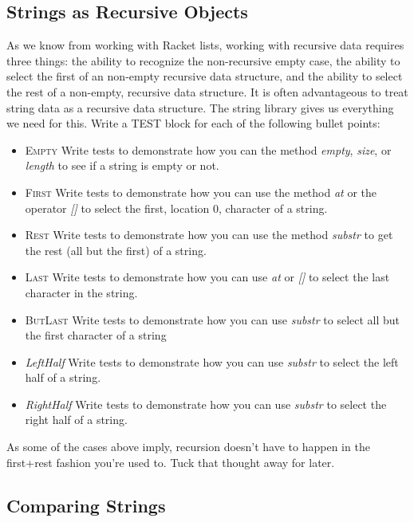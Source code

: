\documentclass[]{tufte-handout}
\begin{document}
\subsection{Strings as Recursive Objects}

As we know from working with Racket lists, working with recursive data requires three things: the ability to recognize the non-recursive empty case, the ability to select the first of an non-empty recursive data structure, and the ability to select the rest of a non-empty, recursive data structure. It is often advantageous to treat string data as a recursive data structure.  The string library gives us everything we need for this.  Write a TEST block for each of the following bullet points:
\begin{itemize}
\item \textsc{Empty} Write tests to demonstrate how you can the method \textit{empty}, \textit{size}, or \textit{length} to see if a string is empty or not.  
\item \textsc{First} Write tests to demonstrate how you can use the method \textit{at} or the operator \textit{[]} to select the first, location $0$, character of a string. 
\item \textsc{Rest} Write tests to demonstrate how you can use the method \textit{substr} to get the rest (all but the first) of a string. 
\item \textsc{Last} Write tests to demonstrate how you can use \textit{at} or \textit{[]} to select the last character in the string.
\item \textsc{ButLast} Write tests to demonstrate how you can use \textit{substr} to select all but the first character of a string
\item \textit{LeftHalf} Write tests to demonstrate how you can use \textit{substr} to select the left half of a string.
\item \textit{RightHalf} Write tests to demonstrate how you can use \textit{substr} to select the right half of a string. 
\end{itemize} 
As some of the cases above imply, recursion doesn't have to happen in the first+rest fashion you're used to.  Tuck that thought away for later. 

\subsection{Comparing Strings}
\end{document}
